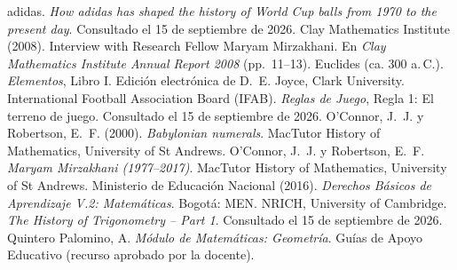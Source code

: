 \documentclass[11pt]{article}
\begin{document}
\begin{referencias}
 adidas. \emph{How adidas has shaped the history of World Cup balls from 1970
  to the present day}. Consultado el 15 de septiembre de 2026.
 Clay Mathematics Institute (2008). Interview with Research Fellow Maryam
  Mirzakhani. En \emph{Clay Mathematics Institute Annual Report 2008} (pp.~11--13).
 Euclides (ca. 300 a.\,C.). \emph{Elementos}, Libro I. Edición electrónica de
  D.~E. Joyce, Clark University.
 International Football Association Board (IFAB). \emph{Reglas de Juego}, Regla 1:
  El terreno de juego. Consultado el 15 de septiembre de 2026.
 O'Connor, J.~J. y Robertson, E.~F. (2000). \emph{Babylonian numerals}.
  MacTutor History of Mathematics, University of St Andrews.
 O'Connor, J.~J. y Robertson, E.~F. \emph{Maryam Mirzakhani
  (1977--2017)}. MacTutor History of Mathematics, University of St Andrews.
 Ministerio de Educación Nacional (2016). \emph{Derechos Básicos de
  Aprendizaje V.2: Matemáticas}. Bogotá: MEN.
 NRICH, University of Cambridge. \emph{The History of Trigonometry -- Part 1}.
  Consultado el 15 de septiembre de 2026.
 Quintero Palomino, A. \emph{Módulo de Matemáticas: Geometría}. Guías de Apoyo
  Educativo (recurso aprobado por la docente).
\end{referencias}
\end{document}
